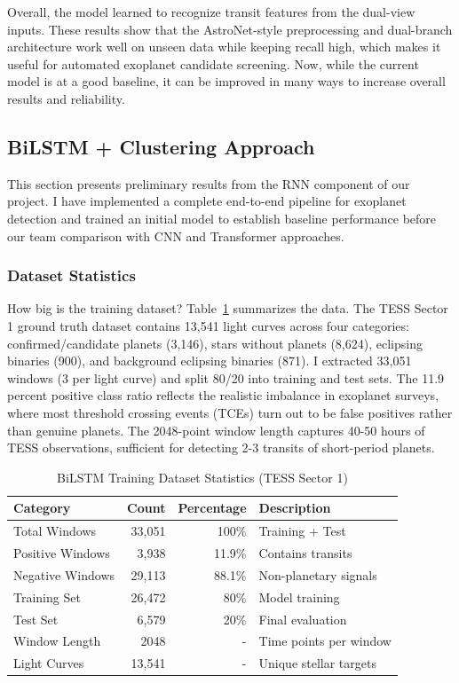 \documentclass[letterpaper]{article} %
\begin{document}
Overall, the model learned to recognize transit features from the dual-view inputs. These results show that the AstroNet-style preprocessing and dual-branch architecture work well on unseen data while keeping recall high, which makes it useful for automated exoplanet candidate screening. Now, while the current model is at a good baseline, it can be improved in many ways to increase overall results and reliability.

\subsection{BiLSTM + Clustering Approach}
This section presents preliminary results from the RNN component of our project. I have implemented a complete end-to-end pipeline for exoplanet detection and trained an initial model to establish baseline performance before our team comparison with CNN and Transformer approaches.

\subsubsection{Dataset Statistics}
How big is the training dataset? Table~\ref{tab:bilstm_dataset} summarizes the data. The TESS Sector 1 ground truth dataset contains 13,541 light curves across four categories: confirmed/candidate planets (3,146), stars without planets (8,624), eclipsing binaries (900), and background eclipsing binaries (871). I extracted 33,051 windows (3 per light curve) and split 80/20 into training and test sets. The 11.9 percent positive class ratio reflects the realistic imbalance in exoplanet surveys, where most threshold crossing events (TCEs) turn out to be false positives rather than genuine planets. The 2048-point window length captures 40-50 hours of TESS observations, sufficient for detecting 2-3 transits of short-period planets.

\begin{table}[h]
\centering
\caption{BiLSTM Training Dataset Statistics (TESS Sector 1)}
\label{tab:bilstm_dataset}
\begin{tabular}{@{}lrrp{2cm}@{}}
\toprule
\textbf{Category} & \textbf{Count} & \textbf{Percentage} & \textbf{Description} \\
\midrule
Total Windows & 33,051 & 100\% & Training + Test \\
Positive Windows & 3,938 & 11.9\% & Contains transits \\
Negative Windows & 29,113 & 88.1\% & Non-planetary signals \\
Training Set & 26,472 & 80\% & Model training \\
Test Set & 6,579 & 20\% & Final evaluation \\
Window Length & 2048 & - & Time points per window \\
Light Curves & 13,541 & - & Unique stellar targets \\
\bottomrule
\end{tabular}
\end{table}
\end{document}

